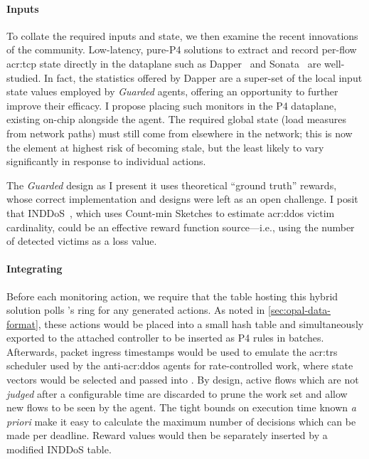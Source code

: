 
\paragraph{Inputs}
To collate the required inputs and state, we then examine the recent innovations of the community.
Low-latency, pure-P4 solutions to extract and record per-flow \gls{acr:tcp} state directly in the dataplane such as Dapper~\parencite{DBLP:conf/sosr/GhasemiBR17} and Sonata~\parencite{DBLP:conf/sigcomm/GuptaHCFRW18} are well-studied.
In fact, the statistics offered by Dapper are a super-set of the local input state values employed by \emph{Guarded} agents, offering an opportunity to further improve their efficacy. 
I propose placing such monitors in the P4 dataplane, existing on-chip alongside the \approachshort{} agent.
The required global state (load measures from network paths) must still come from elsewhere in the network; this is now the element at highest risk of becoming stale, but the least likely to vary significantly in response to individual actions.

The \emph{Guarded} design as I present it uses theoretical ``ground truth'' rewards, whose correct implementation and designs were left as an open challenge. 
I posit that INDDoS~\parencite{tnms-ddos-victim-ident}, which uses Count-min Sketches to estimate \gls{acr:ddos} victim cardinality, could be an effective reward function source---i.e., using the number of detected victims as a loss value.

\paragraph{Integrating \approachshort}
Before each monitoring action, we require that the table hosting this hybrid solution polls \approachshort{}'s \outring{} ring for any generated actions.
As noted in \cref{sec:opal-data-format}, these actions would be placed into a small hash table and simultaneously exported to the attached controller to be inserted as P4 rules in batches.
Afterwards, packet ingress timestamps would be used to emulate the \gls{acr:trs} scheduler used by the anti-\gls{acr:ddos} agents for rate-controlled work, where state vectors would be selected and passed into \approachshort.
By design, active flows which are not \emph{judged} after a configurable time are discarded to prune the work set and allow new flows to be seen by the agent.
The tight bounds on execution time known \emph{a priori} make it easy to calculate the maximum number of decisions which can be made per deadline.
Reward values would then be separately inserted by a modified INDDoS table.

